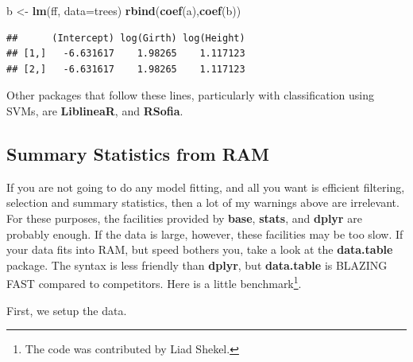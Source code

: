 \documentclass[]{book}
\newenvironment{Shaded}{\begin{snugshade}}{\end{snugshade}}
\newcommand{\KeywordTok}[1]{\textcolor[rgb]{0.13,0.29,0.53}{\textbf{#1}}}
\newcommand{\DataTypeTok}[1]{\textcolor[rgb]{0.13,0.29,0.53}{#1}}
\newcommand{\StringTok}[1]{\textcolor[rgb]{0.31,0.60,0.02}{#1}}
\newcommand{\NormalTok}[1]{#1}
\theoremstyle{definition}
\theoremstyle{definition}
\theoremstyle{definition}
\theoremstyle{remark}
\begin{document}
\begin{Shaded}
\begin{Highlighting}[]
\NormalTok{b <-}\StringTok{ }\KeywordTok{lm}\NormalTok{(ff, }\DataTypeTok{data=}\NormalTok{trees)}
\KeywordTok{rbind}\NormalTok{(}\KeywordTok{coef}\NormalTok{(a),}\KeywordTok{coef}\NormalTok{(b))}
\end{Highlighting}
\end{Shaded}

\begin{verbatim}
##      (Intercept) log(Girth) log(Height)
## [1,]   -6.631617    1.98265    1.117123
## [2,]   -6.631617    1.98265    1.117123
\end{verbatim}

Other packages that follow these lines, particularly with classification
using SVMs, are \textbf{LiblineaR}, and \textbf{RSofia}.

\subsection{Summary Statistics from
RAM}\label{summary-statistics-from-ram}

If you are not going to do any model fitting, and all you want is
efficient filtering, selection and summary statistics, then a lot of my
warnings above are irrelevant. For these purposes, the facilities
provided by \textbf{base}, \textbf{stats}, and \textbf{dplyr} are
probably enough. If the data is large, however, these facilities may be
too slow. If your data fits into RAM, but speed bothers you, take a look
at the \textbf{data.table} package. The syntax is less friendly than
\textbf{dplyr}, but \textbf{data.table} is BLAZING FAST compared to
competitors. Here is a little benchmark\footnote{The code was
  contributed by Liad Shekel.}.

First, we setup the data.
\end{document}
